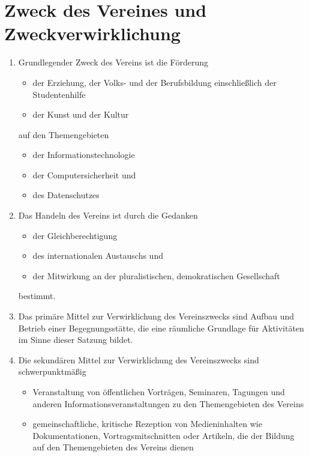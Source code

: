 \documentclass[fontsize=12pt,paper=a4,pagesize,headings=small]{scrartcl}
\begin{document}
\section{Zweck des Vereines und Zweckverwirklichung}
\begin{enumerate}
	\item Grundlegender Zweck des Vereins ist die Förderung
		\begin{itemize}
			\item der Erziehung, der Volks- und der Berufsbildung einschließlich
				  der Studentenhilfe
			\item der Kunst und der Kultur
		\end{itemize}
		auf den Themengebieten
		\begin{itemize}
			\item der Informationstechnologie
			\item der Computersicherheit und
			\item des Datenschutzes
		\end{itemize}

	\item Das Handeln des Vereins ist durch die Gedanken
		\begin{itemize}
			\item der Gleichberechtigung
			\item des internationalen Austauschs und
			\item der Mitwirkung an der pluralistischen, demokratischen
				Gesellschaft
		\end{itemize}
		bestimmt.

	\item Das primäre Mittel zur Verwirklichung des Vereinszwecks sind
		Aufbau und Betrieb einer Begegnungsstätte, die eine räumliche
		Grundlage für Aktivitäten im Sinne dieser Satzung bildet.

	\item Die sekundären Mittel zur Verwirklichung des Vereinszwecks sind
		schwerpunktmäßig

	\begin{itemize}
		\item Veranstaltung von öffentlichen Vorträgen, Seminaren, Tagungen und
			anderen Informationsveranstaltungen zu den Themengebieten
			des Vereins

		\item gemeinschaftliche, kritische Rezeption von Medieninhalten
			wie Dokumentationen, Vortragsmitschnitten oder Artikeln, die der
			Bildung auf den Themengebieten des Vereins dienen


\end{itemize}
\end{enumerate}
\end{document}
